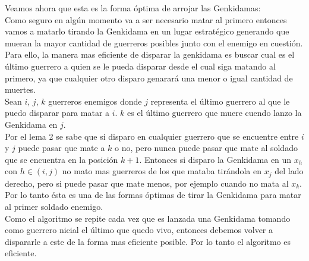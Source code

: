		Veamos ahora que esta es la forma óptima de arrojar las Genkidamas:\\


		Como seguro en algún momento va a ser necesario matar al primero entonces vamos a matarlo tirando la Genkidama en un lugar estratégico generando que mueran la mayor cantidad de guerreros posibles junto con el enemigo en cuestión. Para ello, la manera mas eficiente de disparar la genkidama es buscar cual es el último guerrero a quien se le pueda disparar desde el cual siga matando al primero, ya que cualquier otro disparo genarará una menor o igual cantidad de muertes.\\
		Sean $i$, $j$, $k$ guerreros enemigos donde $j$ representa el último guerrero al que le puedo disparar para matar a $i$. $k$ es el último guerrero que muere cuendo lanzo la Genkidama en $j$.\\
		Por el lema 2 se sabe que si disparo en cualquier guerrero que se encuentre entre $i$ y $j$ puede pasar que mate a $k$ o no, pero nunca puede pasar que mate al soldado que se encuentra en la posición $k+1$. Entonces si disparo la Genkidama en un $x_{h}$ con $h \in (i, j)$ no mato mas guerreros de los que mataba tirándola en $x_{j}$ del lado derecho, pero si puede pasar que mate menos, por ejemplo cuando no mata al $x_{k}$.\\
		Por lo tanto ésta es una de las formas óptimas de tirar la Genkidama para matar al primer soldado enemigo.\\
		Como el algoritmo se repite cada vez que es lanzada una Genkidama tomando como guerrero nicial el último que quedo vivo, entonces debemos volver a dispararle a este de la forma mas eficiente posible. Por lo tanto el algoritmo es eficiente.  \\





